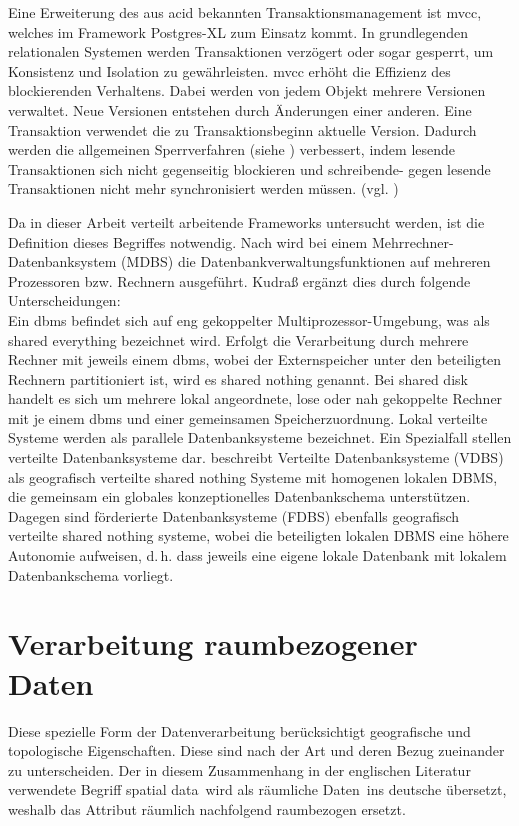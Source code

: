 Eine Erweiterung des aus \Gls{acid} bekannten Transaktionsmanagement ist \Gls{mvcc}, welches im Framework Postgres-XL zum Einsatz kommt.
In grundlegenden relationalen Systemen werden Transaktionen verzögert oder sogar gesperrt, um Konsistenz und Isolation zu gewährleisten.
\Gls{mvcc} erhöht die Effizienz des  blockierenden Verhaltens.
Dabei werden von jedem Objekt mehrere Versionen verwaltet.
Neue Versionen entstehen durch Änderungen einer anderen.
Eine Transaktion verwendet die zu Transaktionsbeginn aktuelle Version.
Dadurch werden die allgemeinen Sperrverfahren (siehe \cite[S.266 ff.]{book:kudrass}) verbessert, indem lesende Transaktionen sich nicht gegenseitig blockieren und schreibende- gegen lesende Transaktionen nicht mehr synchronisiert werden müssen. (vgl. \cite[S.270]{book:kudrass})

Da in dieser Arbeit verteilt arbeitende Frameworks untersucht werden, ist die Definition dieses Begriffes notwendig.
Nach \cite[S.394]{book:kudrass} wird bei einem Mehrrechner-Datenbanksystem (MDBS) die Datenbankverwaltungsfunktionen auf mehreren Prozessoren bzw. Rechnern ausgeführt.
Kudraß ergänzt dies durch folgende Unterscheidungen:\\
Ein \Gls{dbms} befindet sich auf eng gekoppelter Multiprozessor-Umgebung, was als shared everything bezeichnet wird.
Erfolgt die Verarbeitung durch mehrere Rechner mit jeweils einem \Gls{dbms}, wobei der Externspeicher unter den beteiligten Rechnern partitioniert ist, wird es shared nothing genannt.
Bei shared disk handelt es sich um mehrere lokal angeordnete, lose oder nah gekoppelte Rechner mit je einem \Gls{dbms} und einer gemeinsamen Speicherzuordnung.
Lokal verteilte Systeme werden als parallele Datenbanksysteme bezeichnet.
Ein Spezialfall stellen verteilte Datenbanksysteme dar.
\cite[S.398]{book:kudrass} beschreibt Verteilte Datenbanksysteme (VDBS) als geografisch verteilte shared nothing Systeme mit homogenen lokalen DBMS, die gemeinsam ein globales konzeptionelles Datenbankschema unterstützen.
Dagegen sind förderierte Datenbanksysteme (FDBS) ebenfalls geografisch verteilte shared nothing systeme, wobei die beteiligten lokalen DBMS eine höhere Autonomie aufweisen, d.\,h. dass jeweils eine eigene lokale Datenbank mit lokalem Datenbankschema vorliegt.


\section{Verarbeitung raumbezogener Daten}
Diese spezielle Form der Datenverarbeitung berücksichtigt geografische und topologische Eigenschaften.
Diese sind nach der Art und deren Bezug zueinander zu unterscheiden.
Der in diesem Zusammenhang in der englischen Literatur verwendete Begriff \glqq{}spatial data\grqq\ wird als \glqq{}räumliche Daten\grqq\ ins deutsche übersetzt, weshalb das Attribut räumlich nachfolgend raumbezogen ersetzt.

